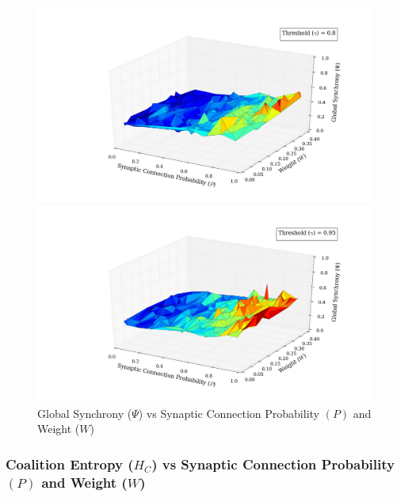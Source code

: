 \documentclass[a4paper,11pt]{article}
\begin{document}
\begin{figure}[H] 
	\begin{minipage}[b]{0.5\linewidth}
		\begin{center}
		\includegraphics[scale = 0.2]{figures/snn/p_w_psi_8_1}
		\end{center}
		\vspace{4ex}
	\end{minipage}
	\begin{minipage}[b]{0.5\linewidth}
		\begin{center}
		\includegraphics[scale = 0.2]{figures/snn/p_w_psi_95_1}
		\end{center}
		\vspace{4ex}
	\end{minipage}
	\caption{
			Global Synchrony ($\Psi$) vs Synaptic Connection Probability $(P)$ and Weight ($W$)
			\label{fig:p_w_psi_all}
		}
\end{figure}

\subsubsection{Coalition Entropy ($H_C$) vs Synaptic Connection Probability $(P)$ and Weight ($W$)}
\end{document}
